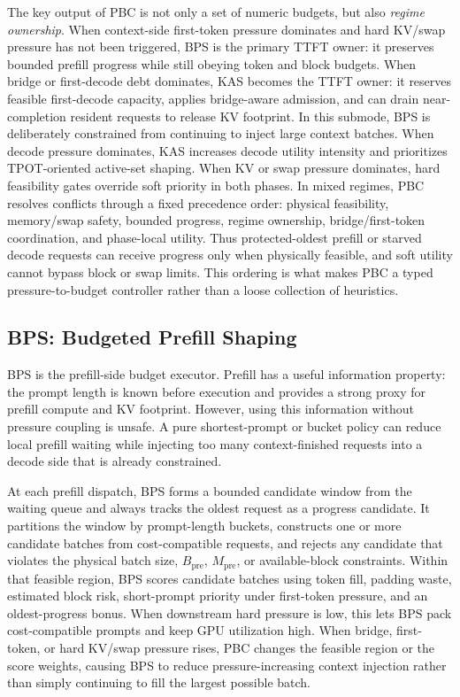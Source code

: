 \documentclass[lettersize,journal]{IEEEtran}
\begin{document}
The key output of PBC is not only a set of numeric budgets, but also \emph{regime ownership}. When context-side first-token pressure dominates and hard KV/swap pressure has not been triggered, BPS is the primary TTFT owner: it preserves bounded prefill progress while still obeying token and block budgets. When bridge or first-decode debt dominates, KAS becomes the TTFT owner: it reserves feasible first-decode capacity, applies bridge-aware admission, and can drain near-completion resident requests to release KV footprint. In this submode, BPS is deliberately constrained from continuing to inject large context batches. When decode pressure dominates, KAS increases decode utility intensity and prioritizes TPOT-oriented active-set shaping. When KV or swap pressure dominates, hard feasibility gates override soft priority in both phases. In mixed regimes, PBC resolves conflicts through a fixed precedence order: physical feasibility, memory/swap safety, bounded progress, regime ownership, bridge/first-token coordination, and phase-local utility. Thus protected-oldest prefill or starved decode requests can receive progress only when physically feasible, and soft utility cannot bypass block or swap limits. This ordering is what makes PBC a typed pressure-to-budget controller rather than a loose collection of heuristics.

\subsection{BPS: Budgeted Prefill Shaping}

BPS is the prefill-side budget executor. Prefill has a useful information property: the prompt length is known before execution and provides a strong proxy for prefill compute and KV footprint. However, using this information without pressure coupling is unsafe. A pure shortest-prompt or bucket policy can reduce local prefill waiting while injecting too many context-finished requests into a decode side that is already constrained.

At each prefill dispatch, BPS forms a bounded candidate window from the waiting queue and always tracks the oldest request as a progress candidate. It partitions the window by prompt-length buckets, constructs one or more candidate batches from cost-compatible requests, and rejects any candidate that violates the physical batch size, $B_{\mathrm{pre}}$, $M_{\mathrm{pre}}$, or available-block constraints. Within that feasible region, BPS scores candidate batches using token fill, padding waste, estimated block risk, short-prompt priority under first-token pressure, and an oldest-progress bonus. When downstream hard pressure is low, this lets BPS pack cost-compatible prompts and keep GPU utilization high. When bridge, first-token, or hard KV/swap pressure rises, PBC changes the feasible region or the score weights, causing BPS to reduce pressure-increasing context injection rather than simply continuing to fill the largest possible batch.
\end{document}
